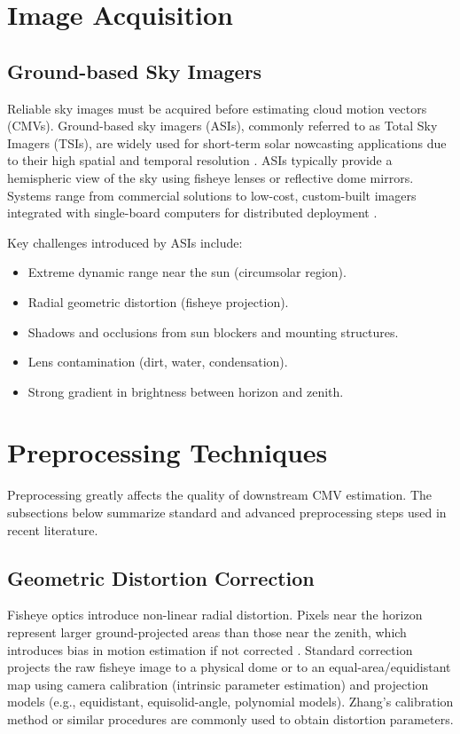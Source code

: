 \section{Image Acquisition}
\label{sec:acquisition_preproc}

\subsection{Ground-based Sky Imagers}
Reliable sky images must be acquired before estimating cloud motion vectors (CMVs). Ground-based sky imagers (ASIs), commonly referred to as Total Sky Imagers (TSIs), are widely used for short-term solar nowcasting applications due to their high spatial and temporal resolution \cite{chow2011,urquhart2016,pfister2003,lin2023}. ASIs typically provide a hemispheric view of the sky using fisheye lenses or reflective dome mirrors. Systems range from commercial solutions to low-cost, custom-built imagers integrated with single-board computers for distributed deployment \cite{ghonima2012,dev2020}.

Key challenges introduced by ASIs include:
\begin{itemize}
  \item Extreme dynamic range near the sun (circumsolar region).
  \item Radial geometric distortion (fisheye projection).
  \item Shadows and occlusions from sun blockers and mounting structures.
  \item Lens contamination (dirt, water, condensation).
  \item Strong gradient in brightness between horizon and zenith.
\end{itemize}

\section{Preprocessing Techniques}
Preprocessing greatly affects the quality of downstream CMV estimation. The subsections below summarize standard and advanced preprocessing steps used in recent literature.

\subsection{Geometric Distortion Correction}
Fisheye optics introduce non-linear radial distortion. Pixels near the horizon represent larger ground-projected areas than those near the zenith, which introduces bias in motion estimation if not corrected \cite{werkmeister2015}. Standard correction projects the raw fisheye image to a physical dome or to an equal-area/equidistant map using camera calibration (intrinsic parameter estimation) and projection models (e.g., equidistant, equisolid-angle, polynomial models). Zhang's calibration method \cite{zhang2000} or similar procedures are commonly used to obtain distortion parameters.

